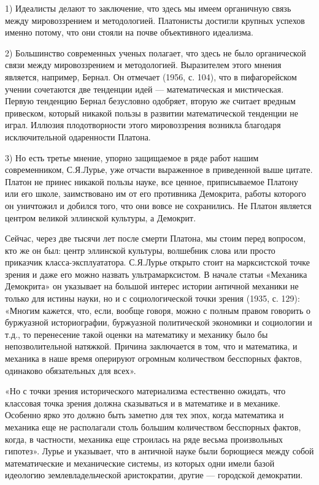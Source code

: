 1) Идеалисты делают то заключение, что здесь мы имеем органичную связь
между  мировоззрением  и  методологией.  Платонисты  достигли  крупных
успехов именно потому, что они стояли на почве объективного идеализма.

2)  Большинство  современных  ученых   полагает,  что  здесь  не  было
органической  связи между  мировоззрением и  методологией. Выразителем
этого  мнения  является,  например,  Бернал.  Он  отмечает  (1956,  с.
104), что  в пифагорейском  учении сочетаются  две тенденции  идей ---
математическая  и  мистическая.  Первую  тенденцию  Бернал  безусловно
одобряет, вторую же считает  вредным привеском, который никакой пользы
в развитии  математической тенденции не играл.  Иллюзия плодотворности
этого  мировоззрения  возникла  благодаря  исключительной  одаренности
Платона.

3)  Но  есть третье  мнение,  упорно  защищаемое  в ряде  работ  нашим
современником,  С.Я.Лурье,   уже  отчасти  выраженное   в  приведенной
выше  цитате.  Платон не  принес  никакой  пользы науке,  все  ценное,
приписываемое Платону или его школе, заимствовано им от его противника
Демокрита, работы которого он уничтожил  и добился того, что они вовсе
не сохранились. Не Платон является центром великой эллинской культуры,
а Демокрит.

Сейчас,  через две  тысячи лет  после смерти  Платона, мы  стоим перед
вопросом, кто же он был: центр эллинской культуры, волшебник слова или
просто  приказчик  класса-эксплуататора.  С.Я.Лурье открыто  стоит  на
марксистской точке зрения и даже его можно назвать ультрамарксистом. В
начале  статьи «Механика  Демокрита» он  указывает на  большой интерес
истории  античной  механики  не  только  для  истины  науки,  но  и  с
социологической  точки зрения  (1935, с.  129): «Многим  кажется, что,
если,  вообще говоря,  можно  с полным  правом  говорить о  буржуазной
историографии,  буржуазной  политической   экономики  и  социологии  и
т.д.,  то  перенесение такой  оценки  на  математику и  механику  было
бы  непозволительной  натяжкой.  Причина  заключается  в  том,  что  и
математика,  и механика  в наше  время оперируют  огромным количеством
бесспорных фактов, одинаково обязательных для всех».

«Но с точки зрения исторического материализма естественно ожидать, что
классовая точка зрения должна сказываться и в математике и в механике.
Особенно ярко это должно быть заметно для тех эпох, когда математика и
механика  еще  не  располагали столь  большим  количеством  бесспорных
фактов,  когда, в  частности, механика  еще строилась  на ряде  весьма
произвольных гипотез».  Лурье и указывает,  что в античной  науке были
борющиеся  между  собой  математические  и  механические  системы,  из
которых  одни имели  базой идеологию  землевладельческой аристократии,
другие --- городской демократии.


